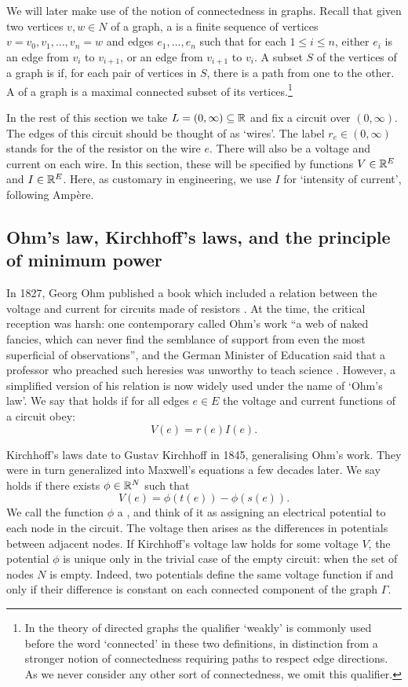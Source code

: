 We will later make use of the notion of connectedness in graphs. Recall that
given two vertices $v, w \in N$ of a graph, a  is a
finite sequence of vertices $v = v_0, v_1, \dots , v_n = w$ and edges $e_1,
\dots , e_n$ such that for each $1 \le i \le n$, either $e_i$ is an edge from
$v_i$ to $v_{i+1}$, or an edge from $v_{i+1}$ to $v_i$. A subset $S$ of the
vertices of a graph is  if, for each pair of vertices in $S$,
there is a path from one to the other. A  of a graph
is a maximal connected subset of its vertices.\footnote{In the theory of
directed graphs the qualifier `weakly' is commonly used before the word
`connected' in these two definitions, in distinction from a stronger notion of
connectedness requiring paths to respect edge directions. As we never consider
any other sort of connectedness, we omit this qualifier.}

In the rest of this section we take $L = (0,\infty) \subseteq {\mathbb{R}}$ and fix a circuit over 
$(0,\infty)$.  The edges of this circuit should be thought of as `wires'.  The label 
$r_e \in (0,\infty)$ stands for the  of the resistor on the wire $e$.   
There will also be a voltage and current on each wire.  In this section, these will
be specified by functions $V \in {\mathbb{R}}^E$ and $I \in {\mathbb{R}}^E$.  Here, as customary in
engineering, we use $I$ for `intensity of current', following Amp\`ere.  

\subsection{Ohm's law, Kirchhoff's laws, and the principle of minimum power}

In 1827, Georg Ohm published a book which included a relation between the voltage
and current for circuits made of resistors \cite{O}.  At the time, the critical
reception was harsh: one contemporary called Ohm's work ``a web of naked
fancies, which can never find the semblance of support from even the most
superficial of observations'', and the German Minister of Education said that a
professor who preached such heresies was unworthy to teach science \cite{D,H}.
However, a simplified version of his relation is now widely used under the name
of `Ohm's law'. We say that  holds if for all edges $e \in
E$ the voltage and current functions of a circuit obey:
\[ 
V(e) = r(e) I(e).  \label{ohm}  
\]

Kirchhoff's laws date to Gustav Kirchhoff in 1845, generalising Ohm's work. They
were in turn generalized into Maxwell's equations a few decades later. We say
 holds if there exists $\phi \in {\mathbb{R}}^N$ such that
\[
V(e) = \phi(t(e)) - \phi(s(e)).
\]
We call the function $\phi$ a , and think of it as assigning
an electrical potential to each node in the circuit. The voltage then arises as
the differences in potentials between adjacent nodes. If Kirchhoff's voltage law
holds for some voltage $V$, the potential $\phi$ is unique only in the trivial
case of the empty circuit: when the set of nodes $N$ is empty. Indeed, two
potentials define the same voltage function if and only if their difference is
constant on each connected component of the graph $\Gamma$.

